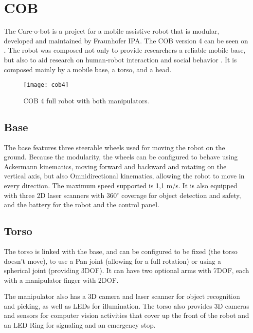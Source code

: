 \section{COB}

The Care-o-bot is a project for a mobile assistive robot that is modular, developed and maintained by Fraunhofer IPA. The COB version 4 can be seen on . The robot was composed not only to provide researchers a reliable mobile base, but also to aid research on human-robot interaction and social behavior \cite{mci/Kittmann2015}. It is composed mainly by a mobile base, a torso, and a head.

\begin{figure}[!ht]
\centering
\texttt{[image: cob4]}
\caption{COB 4 full robot with both manipulators.}
\label{fig:cob4}
\end{figure}

\subsection{Base}

The base features three steerable wheels used for moving the robot on the ground. Because the modularity, the wheels can be configured to behave using Ackermann kinematics, moving forward and backward and rotating on the vertical axis, but also Omnidirectional kinematics, allowing the robot to move in every direction. The maximum speed supported is 1,1 m/s. It is also equipped with three 2D laser scanners with 360$^{\circ}$ coverage for object detection and safety, and the battery for the robot and the control panel.

\subsection{Torso}

The torso is linked with the base, and can be configured to be fixed (the torso doesn't move), to use a Pan joint (allowing for a full rotation) or using a spherical joint (providing 3DOF). It can have two optional arms with 7DOF, each with a manipulator finger with 2DOF.

The manipulator also has a 3D camera and laser scanner for object recognition and picking, as well as LEDs for illumination. The torso also provides 3D cameras and sensors for computer vision activities that cover up the front of the robot and an LED Ring for signaling and an emergency stop.

